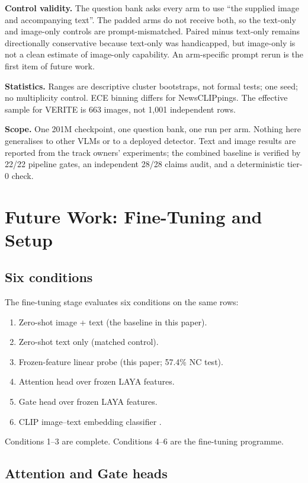 \documentclass[11pt]{article}
\begin{document}
\textbf{Control validity.} The question bank asks every arm to use ``the supplied image and accompanying text''. The padded arms do not receive both, so the text-only and image-only controls are prompt-mismatched. Paired minus text-only remains directionally conservative because text-only was handicapped, but image-only is not a clean estimate of image-only capability. An arm-specific prompt rerun is the first item of future work.

\textbf{Statistics.} Ranges are descriptive cluster bootstraps, not formal tests; one seed; no multiplicity control. ECE binning differs for NewsCLIPpings. The effective sample for VERITE is 663 images, not 1,001 independent rows.

\textbf{Scope.} One 201M checkpoint, one question bank, one run per arm. Nothing here generalises to other VLMs or to a deployed detector. Text and image results are reported from the track owners' experiments; the combined baseline is verified by 22/22 pipeline gates, an independent 28/28 claims audit, and a deterministic tier-0 check.

\section{Future Work: Fine-Tuning and Setup}

\subsection{Six conditions}

The fine-tuning stage evaluates six conditions on the same rows:
\begin{enumerate}[leftmargin=1.4em,itemsep=1pt]
  \item Zero-shot image + text (the baseline in this paper).
  \item Zero-shot text only (matched control).
  \item Frozen-feature linear probe (this paper; 57.4\% NC test).
  \item Attention head over frozen LAYA features.
  \item Gate head over frozen LAYA features.
  \item CLIP image--text embedding classifier \cite{clip}.
\end{enumerate}
Conditions 1--3 are complete. Conditions 4--6 are the fine-tuning programme.

\subsection{Attention and Gate heads}
\end{document}
